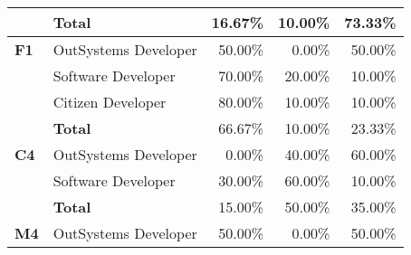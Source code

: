 \begin{table}[tb]
\begin{tabular}{@{}llrrr@{}}
                              & \textbf{Total}       & 16.67\%                                                           & 10.00\%                                                                  & 73.33\%                                                       \\ \midrule
    \textbf{F1}               & OutSystems Developer & 50.00\%                                                           & 0.00\%                                                                  & 50.00\%                                                       \\
                              & Software Developer   & 70.00\%                                                           & 20.00\%                                                                 & 10.00\%                                                       \\
                              & Citizen Developer    & 80.00\%                                                           & 10.00\%                                                                 & 10.00\%                                                       \\
                              & \textbf{Total}       & 66.67\%                                                           & 10.00\%                                                                  & 23.33\%                                                       \\ \midrule
    \textbf{C4}               & OutSystems Developer & 0.00\%                                                            & 40.00\%                                                                 & 60.00\%                                                       \\
                              & Software Developer   & 30.00\%                                                           & 60.00\%                                                                 & 10.00\%                                                       \\
                              & \textbf{Total}       & 15.00\%                                                           & 50.00\%                                                                 & 35.00\%                                                       \\ \midrule
    \textbf{M4}               & OutSystems Developer & 50.00\%                                                           & 0.00\%                                                                  & 50.00\%                                                       \\

\end{tabular}
\end{table}
